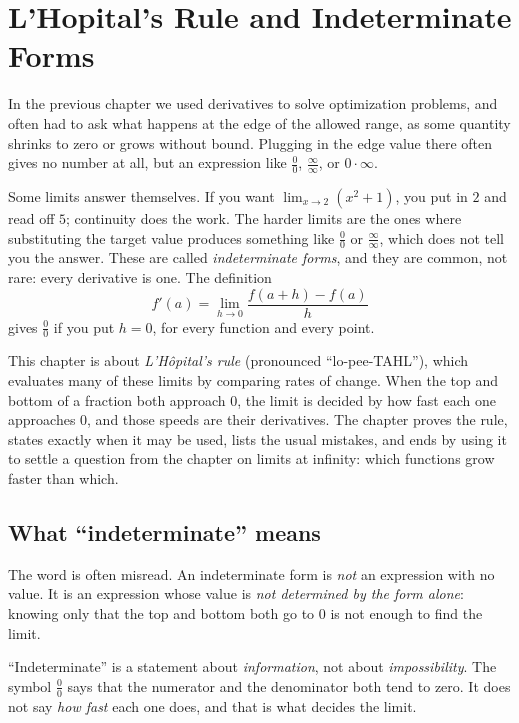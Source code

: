 \chapter{L'Hopital's Rule and Indeterminate Forms}

In the previous chapter we used derivatives to solve optimization problems, and
often had to ask what happens at the edge of the allowed range, as some quantity
shrinks to zero or grows without bound. Plugging in the edge value there often
gives no number at all, but an expression like $\tfrac{0}{0}$,
$\tfrac{\infty}{\infty}$, or $0\cdot\infty$.

Some limits answer themselves. If you want $\lim_{x\to 2}(x^2+1)$, you put in $2$ and
read off $5$; continuity does the work. The harder limits are the ones where
substituting the target value produces something like $\tfrac{0}{0}$ or
$\tfrac{\infty}{\infty}$, which does not tell you the answer. These are called
\emph{indeterminate forms}, and they are common, not rare: every derivative is one.
The definition
\[
f'(a)=\lim_{h\to 0}\frac{f(a+h)-f(a)}{h}
\]
gives $\tfrac{0}{0}$ if you put $h=0$, for every function and every point.

This chapter is about \emph{L'H\^opital's rule} (pronounced ``lo-pee-TAHL''), which
evaluates many of these limits by comparing rates of change. When the top and bottom
of a fraction both approach $0$, the limit is decided by how fast each one approaches
$0$, and those speeds are their derivatives. The chapter proves the rule, states
exactly when it may be used, lists the usual mistakes, and ends by using it to
settle a question from the chapter on limits at infinity: which functions grow faster
than which.

\section{What ``indeterminate'' means}

The word is often misread. An indeterminate form is \emph{not} an expression with
no value. It is an expression whose value is \emph{not determined by the form
alone}: knowing only that the top and bottom both go to $0$ is not enough to find
the limit.

\begin{focusbox}
``Indeterminate'' is a statement about \emph{information}, not about
\emph{impossibility}. The symbol $\tfrac{0}{0}$ says that the numerator and the
denominator both tend to zero. It does not say \emph{how fast} each one does, and that
is what decides the limit.
\end{focusbox}

